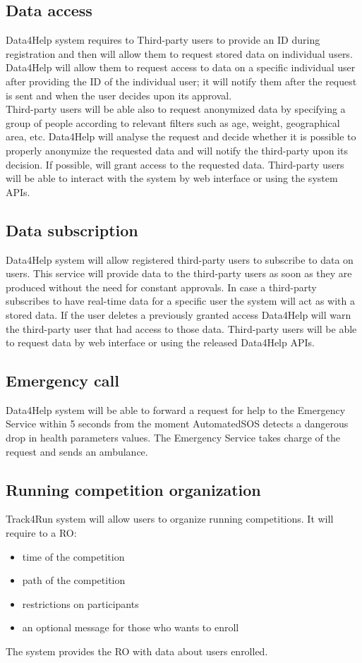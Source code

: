 \subsection{Data access}
Data4Help system requires to Third-party users to provide an ID during registration and then will allow them to request stored data on individual users. Data4Help will allow them to request access to data on a specific individual user after providing the ID of the individual user; it will notify them after the request is sent and when the user decides upon its approval. \\
Third-party users will be able also to request anonymized data by specifying a group of people according to relevant filters such as age, weight, geographical area, etc. 
Data4Help will analyse the request and decide whether it is possible to properly anonymize the requested data and will notify the third-party upon its decision. If possible, will grant access to the requested data. Third-party users will be able to interact with the system by web interface or using the system APIs.
\subsection{Data subscription}
Data4Help system will allow registered third-party users to subscribe to data on users. This service will provide data to the third-party users as soon as they are produced without the need for constant approvals.
In case a third-party subscribes to have real-time data for a specific user the system will act as with a stored data. If the user deletes a previously granted access Data4Help will warn the third-party user that had access to those data. Third-party users will be able to request data by web interface or using the released Data4Help APIs.
\\
\subsection{Emergency call}
Data4Help system will be able to forward a request for help to the Emergency Service within 5 seconds from the moment AutomatedSOS detects a dangerous drop in health parameters values. The Emergency Service takes charge of the request and sends an ambulance. 
\\
\subsection{Running competition organization}
Track4Run system will allow users to organize running competitions. It will require to a RO: 
\begin{itemize}
\item time of the competition
\item path of the competition
\item restrictions on participants 
\item an optional message for those who wants to enroll 
\end{itemize}
The system provides the RO with data about users enrolled.

